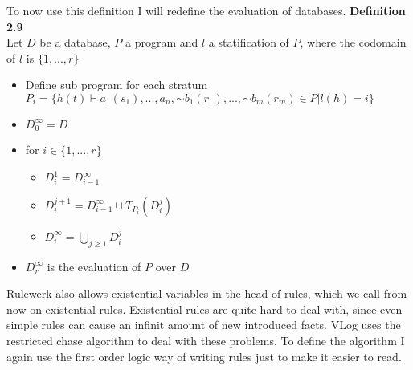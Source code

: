 \documentclass[hyperref, bachelorofscience]{cgvpub}
\renewenvironment{shaded}{%
  \def\FrameCommand{\fboxsep=\FrameSep \colorbox{shadecolor}}%
  \MakeFramed{\advance\hsize-\width \FrameRestore\FrameRestore}}%
 {\endMakeFramed}
\begin{document}
To now use this definition I will redefine the evaluation of databases.
\begin{shaded}
\textbf{Definition 2.9} \\
Let $D$ be a database, $P$ a program and $l$ a statification of $P$, where the codomain of $l$ is $\{ 1,...,r \}$
\begin{itemize}
\item Define sub program for each stratum \\
$P_i = \{ h(t) \vdash a_1(s_1),...,a_n, \mathord{\sim} b_1(r_1),...,\mathord{\sim} b_m(r_m) \in P | l(h) = i \}$
\item $D_0^{\infty} = D$
\item for $i \in \{1,...,r \}$
\begin{itemize}
\item $D_i^1 = D_{i-1}^{\infty}$ 
\item $D_i^{j+1} = D_{i-1}^{\infty} \cup T_{P_i}(D_i^j)$  
\item $D_i^{\infty} = \bigcup_{j \geq 1} D_i^j$
\end{itemize}
\item $D_r^{\infty}$ is the evaluation of $P$ over $D$
\end{itemize}

\end{shaded}

Rulewerk also allows existential variables in the head of rules, which we call from now on existential rules. Existential rules are quite hard to deal with, since even simple rules can cause an infinit amount of new introduced facts. VLog uses the restricted chase algorithm to deal with these problems. To define the algorithm I again use the first order logic way of writing rules just to make it easier to read.
\end{document}
